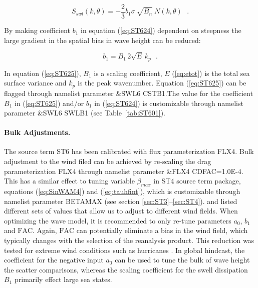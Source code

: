 \begin{equation}\label{eq:ST624}
  S_{swl}(k,\theta) = -\frac{2}{3}b_1 \sigma\ \sqrt{B_n}\ N(k,\theta) \:\:\:.
\end{equation}

\noindent
By making coefficient $b_1$ in equation (\ref{eq:ST624}) dependent
on steepness the large gradient in the spatial bias in wave height
can be reduced:

\begin{equation}\label{eq:ST625}
   b_1 = B_1 \, 2\sqrt{E}\,k_p \:\:\:.
\end{equation}

In equation (\ref{eq:ST625}), $B_1$ is a scaling coefficient,
$E$ (\ref{eq:etot}) is the total sea surface variance  and $k_p$
is the peak wavenumber.  Equation (\ref{eq:ST625}) can be
flagged through namelist parameter {\code \&SWL6 CSTB1}.The value for the
coefficient $B_1$ in (\ref{eq:ST625}) and/or $b_1$ in (\ref{eq:ST624})
is customizable through namelist parameter {\code \&SWL6 SWLB1}
(see Table~\ref{tab:ST601}).

\noindent
\paragraph{Bulk Adjustments.} The source term
{\code ST6} has been calibrated with flux parameterization {\code FLX4}.
Bulk adjustment to the wind filed can be achieved by re-scaling the drag
parameterization {\code FLX4} through namelist parameter {\code
\&FLX4 CDFAC=1.0E-4}.  This has a similar effect to tuning variable
$\beta_{max}$ in {\code ST4} source term package, equations
(\ref{eq:SinWAM4}) and (\ref{eq:tauhfint}), which is customizable
through namelist parameter {\code BETAMAX} (see section
\ref{sec:ST3}--\ref{sec:ST4}). \citet{pro:Aea11} and \citet{art:RA13}
listed different sets of values that allow us to adjust to different
wind fields. When optimizing the wave model, it is recommended to
only re-tune parameters $a_0$, $b_1$ and $\mathrm{FAC}$. Again, $\mathrm{FAC}$
can potentially eliminate a bias in the wind field, which typically changes
with the selection of the reanalysis product. This reduction was tested
for extreme wind conditions such as hurricanes \citep{art:ZBRY13}.  In global
hindcast, the coefficient for the negative input $a_0$ can be used to tune
the bulk of wave height the scatter comparisons, whereas the scaling
coefficient for the swell dissipation $B_1$ primarily effect large sea states.

